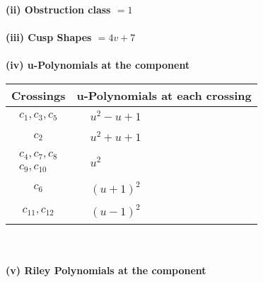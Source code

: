 \documentclass[1p]{elsarticle_modified}
\theoremstyle{definition}
\begin{document}
\flushleft \textbf{(ii) Obstruction class $= 1$}\\~\\
\flushleft \textbf{(iii) Cusp Shapes $= 4 v+7$}\\~\\
\newpage\renewcommand{\arraystretch}{1}
\flushleft \textbf{(iv) u-Polynomials at the component}\newline \\
\begin{tabular}{m{50pt}|m{274pt}}
Crossings & \hspace{64pt}u-Polynomials at each crossing \\
\hline $$\begin{aligned}c_{1},c_{3},c_{5}\end{aligned}$$&$\begin{aligned}
&u^2- u+1
\end{aligned}$\\
\hline $$\begin{aligned}c_{2}\end{aligned}$$&$\begin{aligned}
&u^2+u+1
\end{aligned}$\\
\hline $$\begin{aligned}c_{4},c_{7},c_{8}\\c_{9},c_{10}\end{aligned}$$&$\begin{aligned}
&u^2
\end{aligned}$\\
\hline $$\begin{aligned}c_{6}\end{aligned}$$&$\begin{aligned}
&(u+1)^2
\end{aligned}$\\
\hline $$\begin{aligned}c_{11},c_{12}\end{aligned}$$&$\begin{aligned}
&(u-1)^2
\end{aligned}$\\
\hline
\end{tabular}\\~\\
\newpage\renewcommand{\arraystretch}{1}
\flushleft \textbf{(v) Riley Polynomials at the component}\newline \\
\end{document}
